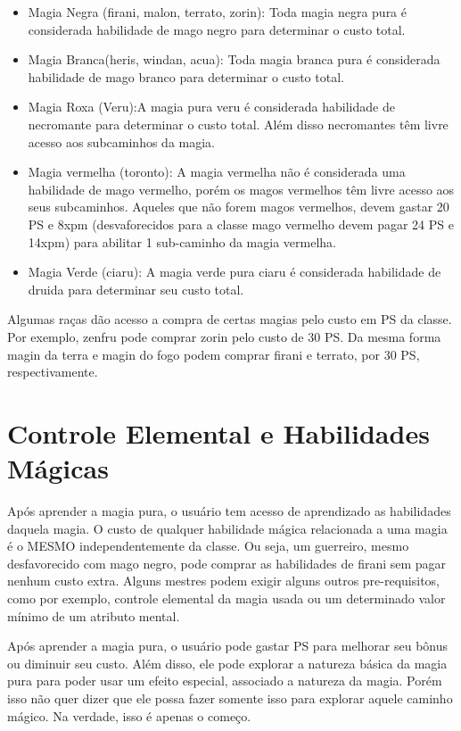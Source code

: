 \begin{itemize}
	\item Magia Negra (firani, malon, terrato, zorin): Toda magia negra pura é considerada habilidade de mago negro para determinar o custo total.

	\item Magia Branca(heris, windan, acua): Toda magia branca pura é considerada habilidade de mago branco para determinar o custo total.

	\item Magia Roxa (Veru):A magia pura veru é considerada habilidade de necromante para determinar o custo total. Além disso necromantes têm livre acesso aos subcaminhos da magia.

	\item Magia vermelha (toronto): A magia vermelha não é considerada uma habilidade de mago vermelho, porém os magos vermelhos têm livre acesso aos seus subcaminhos. Aqueles que não forem magos vermelhos, devem gastar 20 PS e 8xpm (desvaforecidos para a classe mago vermelho devem pagar 24 PS e 14xpm) para abilitar 1 sub-caminho da magia vermelha. 

	\item Magia Verde (ciaru): A magia verde pura ciaru é considerada habilidade de druida para determinar seu custo total.
\end{itemize}

Algumas raças dão acesso a compra de certas magias pelo custo em PS da classe. Por exemplo, zenfru pode comprar zorin pelo custo de 30 PS. Da mesma forma magin da terra e magin do fogo podem comprar firani e terrato, por 30 PS, respectivamente.

\section{Controle Elemental e Habilidades Mágicas}
Após aprender a magia pura, o usuário tem acesso de aprendizado as habilidades daquela magia. O custo de qualquer habilidade mágica relacionada a uma magia é o MESMO independentemente da classe. Ou seja, um guerreiro, mesmo desfavorecido com mago negro, pode comprar as habilidades de firani sem pagar nenhum custo extra. Alguns mestres podem exigir alguns outros pre-requisitos, como por exemplo, controle elemental da magia usada ou um determinado valor mínimo de um atributo mental.

Após aprender a magia pura, o usuário pode gastar PS para melhorar seu bônus ou diminuir seu custo. Além disso, ele pode explorar a natureza básica da magia pura para poder usar um efeito especial, associado a natureza da magia. Porém isso não quer dizer que ele possa fazer somente isso para explorar aquele caminho mágico. Na verdade, isso é apenas o começo.

